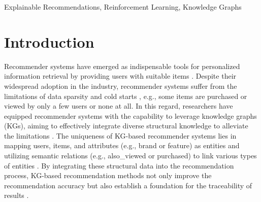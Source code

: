 \documentclass[conference]{IEEEtran}
\begin{document}
\begin{abstract}
Knowledge graphs (KGs) have been widely adopted to mitigate data sparsity and address cold-start issues in recommender systems. While existing KGs-based recommendation methods can predict user preferences and demands, they fall short in generating explicit recommendation paths and lack explainability. As a step beyond the above methods, recent advancements utilize reinforcement learning (RL) to find suitable items for a given user via explainable recommendation paths. However, the performance of these solutions is still limited by the following two points. (1) Lack of ability to capture contextual dependencies from neighboring information. (2) The excessive reliance on short recommendation paths due to efficiency concerns. To surmount these challenges, we propose a category-aware dual-agent reinforcement learning (CADRL) model for explainable recommendations over KGs. %
Specifically, our model comprises two components: (1) a category-aware gated graph neural network that jointly captures context-aware item representations from neighboring entities and categories, and (2) a dual-agent RL framework where two agents efficiently  traverse long paths to search for suitable items. Finally, experimental results show that CADRL outperforms state-of-the-art models in terms of both effectiveness and efficiency on large-scale datasets.


\end{abstract}

\begin{IEEEkeywords}
Explainable Recommendations, Reinforcement Learning, Knowledge Graphs%
\end{IEEEkeywords}

\section{Introduction}
Recommender systems have emerged as indispensable tools for personalized information retrieval by providing users with suitable items \cite{survey2} \cite{survey3} \cite{EX5}. Despite their widespread adoption in the industry, recommender systems suffer from the limitations of data sparsity and cold starts \cite{Ripplenet}, e.g., some items are purchased or viewed by only a few users or none at all. In this regard, researchers have equipped recommender systems with the capability to leverage knowledge graphs (KGs), aiming to effectively integrate diverse structural knowledge to alleviate the limitations \cite{KGAT}. The uniqueness of KG-based recommender systems lies in mapping users, items, and attributes (e.g., brand or feature) as entities and utilizing semantic relations (e.g., also\_viewed or purchased) to link various types of entities \cite{MetaKG}. By integrating these structural data into the recommendation process, KG-based recommendation methods not only improve the recommendation accuracy but also establish a foundation for the traceability of results \cite{EMKR}.
\end{document}
